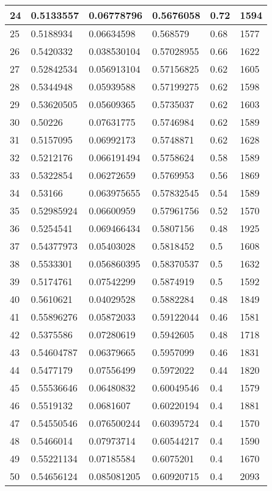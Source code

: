 \begin{longtable}{|l|l|l|l|l|l|}
24 & 0.5133557 & 0.06778796 & 0.5676058 & 0.72 & 1594 \\ \hline 
25 & 0.5188934 & 0.06634598 & 0.568579 & 0.68 & 1577 \\ \hline 
26 & 0.5420332 & 0.038530104 & 0.57028955 & 0.66 & 1622 \\ \hline 
27 & 0.52842534 & 0.056913104 & 0.57156825 & 0.62 & 1605 \\ \hline 
28 & 0.5344948 & 0.05939588 & 0.57199275 & 0.62 & 1598 \\ \hline 
29 & 0.53620505 & 0.05609365 & 0.5735037 & 0.62 & 1603 \\ \hline 
30 & 0.50226 & 0.07631775 & 0.5746984 & 0.62 & 1589 \\ \hline 
31 & 0.5157095 & 0.06992173 & 0.5748871 & 0.62 & 1628 \\ \hline 
32 & 0.5212176 & 0.066191494 & 0.5758624 & 0.58 & 1589 \\ \hline 
33 & 0.5322854 & 0.06272659 & 0.5769953 & 0.56 & 1869 \\ \hline 
34 & 0.53166 & 0.063975655 & 0.57832545 & 0.54 & 1589 \\ \hline 
35 & 0.52985924 & 0.06600959 & 0.57961756 & 0.52 & 1570 \\ \hline 
36 & 0.5254541 & 0.069466434 & 0.5807156 & 0.48 & 1925 \\ \hline 
37 & 0.54377973 & 0.05403028 & 0.5818452 & 0.5 & 1608 \\ \hline 
38 & 0.5533301 & 0.056860395 & 0.58370537 & 0.5 & 1632 \\ \hline 
39 & 0.5174761 & 0.07542299 & 0.5874919 & 0.5 & 1592 \\ \hline 
40 & 0.5610621 & 0.04029528 & 0.5882284 & 0.48 & 1849 \\ \hline 
41 & 0.55896276 & 0.05872033 & 0.59122044 & 0.46 & 1581 \\ \hline 
42 & 0.5375586 & 0.07280619 & 0.5942605 & 0.48 & 1718 \\ \hline 
43 & 0.54604787 & 0.06379665 & 0.5957099 & 0.46 & 1831 \\ \hline 
44 & 0.5477179 & 0.07556499 & 0.5972022 & 0.44 & 1820 \\ \hline 
45 & 0.55536646 & 0.06480832 & 0.60049546 & 0.4 & 1579 \\ \hline 
46 & 0.5519132 & 0.0681607 & 0.60220194 & 0.4 & 1881 \\ \hline 
47 & 0.54550546 & 0.076500244 & 0.60395724 & 0.4 & 1570 \\ \hline 
48 & 0.5466014 & 0.07973714 & 0.60544217 & 0.4 & 1590 \\ \hline 
49 & 0.55221134 & 0.07185584 & 0.6075201 & 0.4 & 1670 \\ \hline 
50 & 0.54656124 & 0.085081205 & 0.60920715 & 0.4 & 2093 \\ \hline 
\end{longtable}